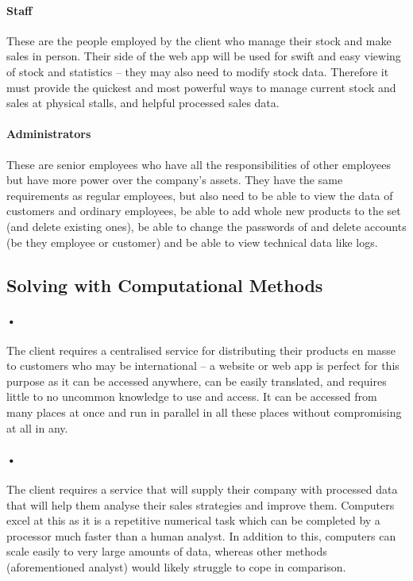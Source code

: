 \documentclass{article}
\begin{document}
    \paragraph{Staff}
    These are the people employed by the client who manage their stock and make sales in person. 
    Their side of the web app will be used for swift and easy viewing of stock and statistics – they may also need to modify stock data. 
    Therefore it must provide the quickest and most powerful ways to manage current stock and sales at physical stalls, and helpful processed sales data.
    \paragraph{Administrators} 
    These are senior employees who have all the responsibilities of other employees but have more power over the company’s assets. 
    They have the same requirements as regular employees, but also need to be able to view the data of customers and ordinary employees, be able to add whole new products to the set (and delete existing ones), be able to change the passwords of and delete accounts (be they employee or customer) and be able to view technical data like logs.
    
    \subsection{Solving with Computational Methods}
    \paragraph{•}
    The client requires a centralised service for distributing their products en masse to customers who may be international – a website or web app is perfect for this purpose as it can be accessed anywhere, can be easily translated, and requires little to no uncommon knowledge to use and access. 
    It can be accessed from many places at once and run in parallel in all these places without compromising at all in any.
    \paragraph{•}
    The client requires a service that will supply their company with processed data that will help them analyse their sales strategies and improve them. 
    Computers excel at this as it is a repetitive numerical task which can be completed by a processor much faster than a human analyst. 
    In addition to this, computers can scale easily to very large amounts of data, whereas other methods (aforementioned analyst) would likely struggle to cope in comparison.
\end{document}
